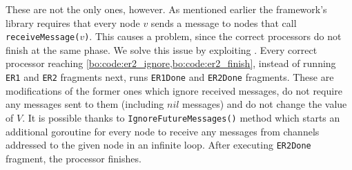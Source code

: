 These are not the only ones, however. As mentioned earlier the framework's library requires that every node $v$ sends a message to nodes that call \texttt{receiveMessage($v$)}. This causes a problem, since the correct processors do not finish at the same phase. We solve this issue by exploiting . Every correct processor reaching \cref{bo:code:er2_ignore,bo:code:er2_finish}, instead of running \texttt{ER1} and \texttt{ER2} fragments next, runs \texttt{ER1Done} and \texttt{ER2Done} fragments. These are modifications of the former ones which ignore received messages, do not require any messages sent to them (including $nil$ messages) and do not change the value of $V$. It is possible thanks to \texttt{IgnoreFutureMessages()} method which starts an additional goroutine for every node to receive any messages from channels addressed to the given node in an infinite loop. After executing \texttt{ER2Done} fragment, the processor finishes.